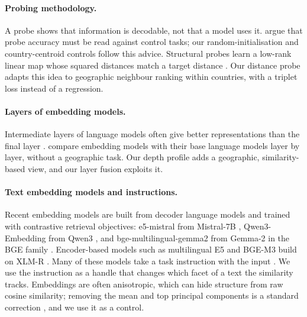 \paragraph{Probing methodology.}
A probe shows that information is decodable, not that a model uses it. \citet{hewitt2019control} argue that probe accuracy must be read against control tasks; our random-initialisation and country-centroid controls follow this advice. Structural probes learn a low-rank linear map whose squared distances match a target distance \citep{hewitt2019structural}. Our distance probe adapts this idea to geographic neighbour ranking within countries, with a triplet loss instead of a regression.

\paragraph{Layers of embedding models.}
Intermediate layers of language models often give better representations than the final layer \citep{skean2025layer}. \citet{jiang2026layerwise} compare embedding models with their base language models layer by layer, without a geographic task. Our depth profile adds a geographic, similarity-based view, and our layer fusion exploits it.

\paragraph{Text embedding models and instructions.}
Recent embedding models are built from decoder language models and trained with contrastive retrieval objectives: e5-mistral from Mistral-7B \citep{wang2024improving,jiang2023mistral}, Qwen3-Embedding from Qwen3 \citep{zhang2025qwen,qwen3technicalreport}, and bge-multilingual-gemma2 from Gemma-2 \citep{gemmateam2024gemma2} in the BGE family \citep{xiao2023cpack}. Encoder-based models such as multilingual E5 \citep{wang2024e5} and BGE-M3 \citep{chen2024m3} build on XLM-R \citep{conneau2019xlmr}. Many of these models take a task instruction with the input \citep{su2023instructor,wang2024improving}. We use the instruction as a handle that changes which facet of a text the similarity tracks. Embeddings are often anisotropic, which can hide structure from raw cosine similarity; removing the mean and top principal components is a standard correction \citep{mu2018allbutthetop}, and we use it as a control.
